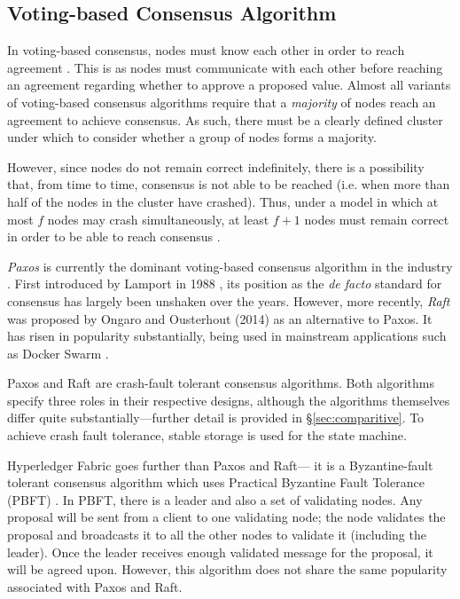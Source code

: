 \documentclass[12pt, a4paper]{article}
\begin{document}
\subsection{Voting-based Consensus Algorithm}
In voting-based consensus, nodes must know each other in order to reach agreement \cite{nguyen2018survey}. This is as nodes must communicate with each other before reaching an agreement regarding whether to approve a proposed value. Almost all variants of voting-based consensus algorithms require that a \textit{majority} of nodes reach an agreement to achieve consensus. As such, there must be a clearly defined cluster under which to consider whether a group of nodes forms a majority.

However, since nodes do not remain correct indefinitely, there is a possibility that, from time to time, consensus is not able to be reached (i.e. when more than half of the nodes in the cluster have crashed).
Thus, under a model in which at most $f$ nodes may crash simultaneously, at least $f+1$ nodes must remain correct in order to be able to reach consensus \cite{nguyen2018survey}.

\textit{Paxos} is currently the dominant voting-based consensus algorithm in the industry \cite{ongaro2014search}. First introduced by Lamport in 1988 \cite{oki1988viewstamped}, its position as the \textit{de facto} standard for consensus has largely been unshaken over the years. However, more recently, \textit{Raft} was proposed by Ongaro and Ousterhout (2014) \cite{ongaro2014search} as an alternative to Paxos. It has risen in popularity substantially, being used in mainstream applications such as Docker Swarm \cite{dockerdocumentation}.

Paxos and Raft are crash-fault tolerant consensus algorithms. Both algorithms specify three roles in their respective designs, although the algorithms themselves differ quite substantially---further detail is provided in \S\ref{sec:comparitive}. To achieve crash fault tolerance, stable storage is used for the state machine.

Hyperledger Fabric \cite{cachin2016architecture} goes further than Paxos and Raft--- it is a Byzantine-fault tolerant consensus algorithm which uses  Practical Byzantine Fault Tolerance (PBFT) \cite{castro1999practical}.
In PBFT, there is a leader and also a set of validating nodes. Any proposal will be sent from a client to one validating node; the node validates the proposal and broadcasts it to all the other nodes to validate it (including the leader). Once the leader receives enough validated message for the proposal, it will be agreed upon. However, this algorithm does not share the same popularity associated with Paxos and Raft.
\end{document}
